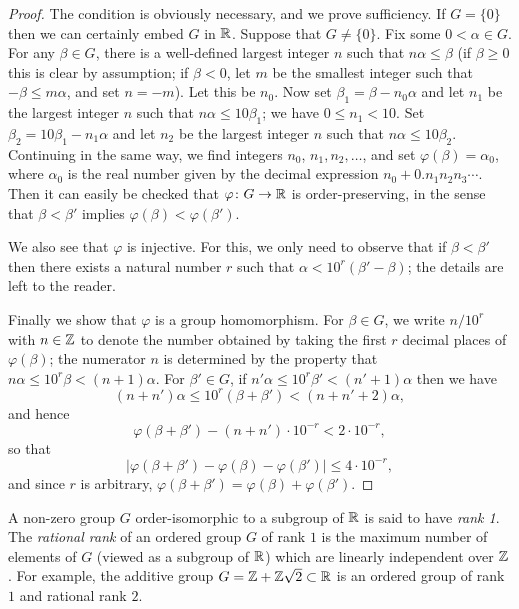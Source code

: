 \begin{proof}
The condition is obviously necessary, and we prove sufficiency. If
$G = \{0\}$ then we can certainly embed $G$ in $\mathbb{R}$. Suppose that $G \neq \{0\}$.
Fix some $0 < \alpha \in G$. For any $\beta \in G$, there is a well-defined largest integer
$n$ such that $n\alpha \le \beta$ (if $\beta \ge 0$ this is clear by assumption; if $\beta < 0$, let $m$ be
the smallest integer such that $-\beta \le m\alpha$, and set $n = -m$). Let this be $n_0$.
Now set $\beta_1 = \beta - n_0\alpha$ and let $n_1$ be the largest integer $n$ such that $n\alpha \le 10\beta_1$;
we have $0 \le n_1 < 10$. Set $\beta_2 = 10\beta_1 - n_1\alpha$ and let $n_2$ be the largest integer
$n$ such that $n\alpha \le 10\beta_2$. Continuing in the same way, we find integers $n_0$,
$n_1, n_2, \ldots$, and set $\varphi(\beta) = \alpha_0$, where $\alpha_0$ is the real number given by the decimal
expression $n_0 + 0.n_1n_2n_3\cdots$. Then it can easily be checked that $\varphi\colon G \to \mathbb{R}$
is order-preserving, in the sense that $\beta < \beta'$ implies $\varphi(\beta) < \varphi(\beta')$.

We also see that $\varphi$ is injective. For this, we only need to observe that
if $\beta < \beta'$ then there exists a natural number $r$ such that $\alpha < 10^r(\beta' - \beta)$;
the details are left to the reader.

Finally we show that $\varphi$ is a group homomorphism. For $\beta \in G$, we write
$n/10^r$ with $n \in \mathbb{Z}$ to denote the number obtained by taking the first $r$
decimal places of $\varphi(\beta)$; the numerator $n$ is determined by the property that
$n\alpha \le 10^r\beta < (n + 1)\alpha$. For $\beta' \in G$, if $n'\alpha \le 10^r\beta' < (n' + 1)\alpha$ then we have
\[
  (n + n')\alpha \le 10^r(\beta + \beta') < (n + n' + 2)\alpha,
\]
and hence
\[
  \varphi(\beta + \beta') - (n + n') \cdot 10^{-r} < 2 \cdot 10^{-r},
\]
so that
\[
  |\varphi(\beta + \beta') - \varphi(\beta) - \varphi(\beta')| \le 4 \cdot 10^{-r},
\]
and since $r$ is arbitrary, $\varphi(\beta + \beta') = \varphi(\beta) + \varphi(\beta')$.
\end{proof}

A non-zero group $G$ order-isomorphic to a subgroup of $\mathbb{R}$ is said to have
\emph{rank 1}. The \emph{rational rank} of an ordered group $G$ of rank $1$ is the maximum
number of elements of $G$ (viewed as a subgroup of $\mathbb{R}$) which are linearly
independent over $\mathbb{Z}$. For example, the additive group $G = \mathbb{Z} + \mathbb{Z}\sqrt{2} \subset \mathbb{R}$ is
an ordered group of rank $1$ and rational rank $2$.

